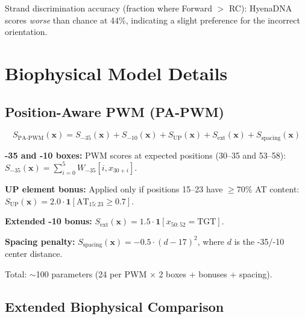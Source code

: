 \documentclass{article}
\begin{document}
Strand discrimination accuracy (fraction where Forward $>$ RC): HyenaDNA scores
\emph{worse} than chance at 44\%, indicating a slight preference for the incorrect orientation.

\section{Biophysical Model Details}
\label{app:biophysical}

\subsection{Position-Aware PWM (PA-PWM)}

\begin{equation}
S_{\text{PA-PWM}}(\mathbf{x}) = S_{-35}(\mathbf{x}) + S_{-10}(\mathbf{x}) + S_{\text{UP}}(\mathbf{x}) + S_{\text{ext}}(\mathbf{x}) + S_{\text{spacing}}(\mathbf{x})
\end{equation}

\textbf{-35 and -10 boxes:} PWM scores at expected positions (30--35 and 53--58):
$S_{-35}(\mathbf{x}) = \sum_{i=0}^{5} W_{-35}[i, x_{30+i}]$.

\textbf{UP element bonus:} Applied only if positions 15--23 have $\geq$70\% AT content:
$S_{\text{UP}}(\mathbf{x}) = 2.0 \cdot \mathbf{1}[\text{AT}_{15:23} \geq 0.7]$.

\textbf{Extended -10 bonus:} $S_{\text{ext}}(\mathbf{x}) = 1.5 \cdot \mathbf{1}[x_{50:52} = \text{TGT}]$.

\textbf{Spacing penalty:} $S_{\text{spacing}}(\mathbf{x}) = -0.5 \cdot (d - 17)^2$, where $d$
is the -35/-10 center distance.

Total: $\sim$100 parameters (24 per PWM $\times$ 2 boxes + bonuses + spacing).

\subsection{Extended Biophysical Comparison}
\end{document}
